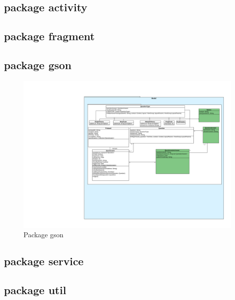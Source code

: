 \documentclass[a4paper]{scrreprt}
\begin{document}
            \subsection{package activity}


            \subsection{package fragment}
            \subsection{package gson}
                \begin{figure}[H]
                    \centering
                    \includegraphics[scale = 0.8]{gson.pdf}
                    \caption{Package gson}
                \end{figure}
            \subsection{package service}
            \subsection{package util}
\end{document}

